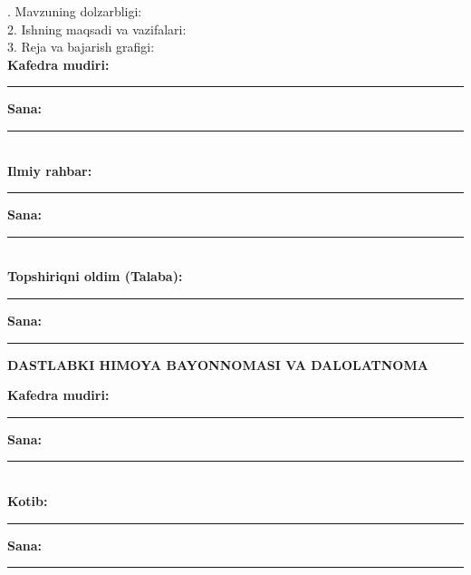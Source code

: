 \vspace{1em}
. Mavzuning dolzarbligi:\\
2. Ishning maqsadi va vazifalari:\\
3. Reja va bajarish grafigi:\\

\vspace{3cm}
\noindent
\textbf{Kafedra mudiri:} \rule{4cm}{0.4pt} \hfill \textbf{Sana:} \rule{3cm}{0.4pt}\\
\textbf{Ilmiy rahbar:} \rule{4cm}{0.4pt} \hfill \textbf{Sana:} \rule{3cm}{0.4pt}\\
\textbf{Topshiriqni oldim (Talaba):} \rule{4cm}{0.4pt} \hfill \textbf{Sana:} \rule{3cm}{0.4pt}

\newpage
\thispagestyle{empty}
\begin{center}
 {\large\bfseries DASTLABKI HIMOYA BAYONNOMASI VA DALOLATNOMA}\\[1em]
\end{center}

\vspace{3cm}
\noindent
\textbf{Kafedra mudiri:} \rule{4cm}{0.4pt} \hfill \textbf{Sana:} \rule{3cm}{0.4pt}\\
\textbf{Kotib:} \rule{4cm}{0.4pt} \hfill \textbf{Sana:} \rule{3cm}{0.4pt}
